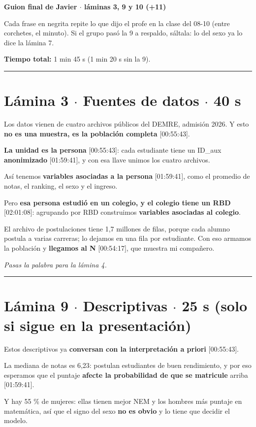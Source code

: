 \documentclass[11pt]{article}
\begin{document}
{\LARGE\bfseries Guion final de Javier $\cdot$ láminas 3, 9 y 10 (+11)\par}\medskip

Cada frase en negrita repite lo que dijo el profe en la clase del 08-10 (entre corchetes, el minuto). Si el grupo pasó la 9 a respaldo, sáltala: lo del sexo ya lo dice la lámina 7.\par

\textbf{Tiempo total:} 1 min 45 s (1 min 20 s sin la 9).\par

\medskip\hrule\medskip

\section*{Lámina 3 $\cdot$ Fuentes de datos $\cdot$ 40 s}

\begin{guion}Los datos vienen de cuatro archivos públicos del DEMRE, admisión 2026. Y esto \textbf{no es una muestra, es la población completa} [00:55:43].\par \textbf{La unidad es la persona} [00:55:43]: cada estudiante tiene un ID\_aux \textbf{anonimizado} [01:59:41], y con esa llave unimos los cuatro archivos.\par Así tenemos \textbf{variables asociadas a la persona} [01:59:41], como el promedio de notas, el ranking, el sexo y el ingreso.\par Pero \textbf{esa persona estudió en un colegio, y el colegio tiene un RBD} [02:01:08]: agrupando por RBD construimos \textbf{variables asociadas al colegio}.\par El archivo de postulaciones tiene 1,7 millones de filas, porque cada alumno postula a varias carreras; lo dejamos en una fila por estudiante. Con eso armamos la población y \textbf{llegamos al N} [00:54:17], que muestra mi compañero.\end{guion}

\textit{Pasas la palabra para la lámina 4.}\par

\medskip\hrule\medskip

\section*{Lámina 9 $\cdot$ Descriptivas $\cdot$ 25 s (solo si sigue en la presentación)}

\begin{guion}Estos descriptivos ya \textbf{conversan con la interpretación a priori} [00:55:43].\par La mediana de notas es 6,23: postulan estudiantes de buen rendimiento, y por eso esperamos que el puntaje \textbf{afecte la probabilidad de que se matricule} arriba [01:59:41].\par Y hay 55 \% de mujeres: ellas tienen mejor NEM y los hombres más puntaje en matemática, así que el signo del sexo \textbf{no es obvio} y lo tiene que decidir el modelo.\end{guion}
\end{document}

